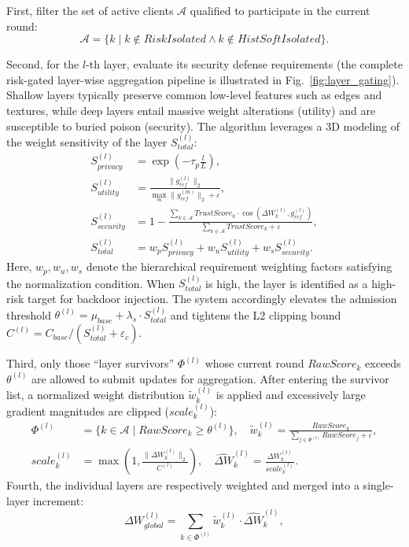\documentclass[runningheads]{llncs}
\begin{document}
First, filter the set of active clients $\mathcal{A}$ qualified to participate in the current round:
\begin{equation} \label{eq:active_clients}
    \mathcal{A} = \{k \mid k \notin RiskIsolated \land k \notin HistSoftIsolated\}.
\end{equation}

Second, for the $l$-th layer, evaluate its security defense requirements (the complete risk-gated layer-wise aggregation pipeline is illustrated in Fig.~\ref{fig:layer_gating}). Shallow layers typically preserve common low-level features such as edges and textures, while deep layers entail massive weight alterations (utility) and are susceptible to buried poison (security). The algorithm leverages a 3D modeling of the weight sensitivity of the layer $S_{total}^{(l)}$:
\begin{align}
    S_{privacy}^{(l)} &= \exp\left(-\tau_{p} \frac{l}{L}\right), \\
    S_{utility}^{(l)} &= \frac{\|g_{ref}^{(l)}\|_{2}}{\max_{m}\|g_{ref}^{(m)}\|_{2} + \varepsilon}, \\
    S_{security}^{(l)} &= 1 - \frac{\sum_{k\in\mathcal{A}}TrustScore_{k}\cdot\cos(\Delta W_{k}^{(l)}, g_{ref}^{(l)})}{\sum_{k\in\mathcal{A}}TrustScore_{k} + \varepsilon}, \\
    S_{total}^{(l)} &= w_p S_{privacy}^{(l)} + w_u S_{utility}^{(l)} + w_s S_{security}^{(l)}.
\end{align}
Here, $w_p, w_u, w_s$ denote the hierarchical requirement weighting factors satisfying the normalization condition. When $S_{total}^{(l)}$ is high, the layer is identified as a high-risk target for backdoor injection. The system accordingly elevates the admission threshold $\theta^{(l)} = \mu_{base} + \lambda_{s} \cdot S_{total}^{(l)}$ and tightens the L2 clipping bound $C^{(l)} = C_{base} / (S_{total}^{(l)} + \varepsilon_{c})$.

Third, only those ``layer survivors'' $\Phi^{(l)}$ whose current round $RawScore_k$ exceeds $\theta^{(l)}$ are allowed to submit updates for aggregation. After entering the survivor list, a normalized weight distribution $\tilde{w}_{k}^{(l)}$ is applied and excessively large gradient magnitudes are clipped ($scale_k^{(l)}$):
\begin{align}
    \Phi^{(l)} &= \{k \in \mathcal{A} \mid RawScore_{k} \ge \theta^{(l)} \}, \quad \tilde{w}_{k}^{(l)} = \frac{RawScore_{k}}{\sum_{j\in\Phi^{(l)}}RawScore_{j} + \varepsilon}, \\
    scale_{k}^{(l)} &= \max\left(1, \frac{\|\Delta W_{k}^{(l)}\|_{2}}{C^{(l)}}\right), \quad
    \widehat{\Delta W}_{k}^{(l)} = \frac{\Delta W_{k}^{(l)}}{scale_{k}^{(l)}}.
\end{align}
Fourth, the individual layers are respectively weighted and merged into a single-layer increment:
\begin{equation}
    \Delta W_{global}^{(l)} = \sum_{k\in\Phi^{(l)}}\tilde{w}_{k}^{(l)} \cdot \widehat{\Delta W}_{k}^{(l)},
\end{equation}
\end{document}
